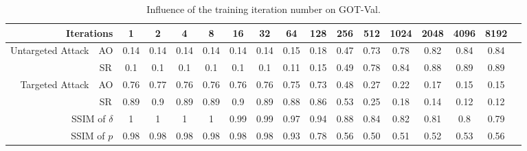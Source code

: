 \documentclass[journal]{IEEEtran}
\begin{document}
\begin{table}
  \centering
  \caption{Influence of the training iteration number on GOT-Val.}
  \begin{tabular}{rcccccccccccccccc} 
  \toprule
  \multicolumn{2}{r}{Iterations}     & 1     & 2     & 4     & 8     & 16    & 32    & 64    & 128   & 256   & 512   & 1024  & 2048  & 4096  & 8192  \\ 
  \midrule
  \multirow{2}{*}{Untargeted Attack} & AO    &  0.14 & 0.14 & 0.14 & 0.14 & 0.14 & 0.14 & 0.15 & 0.18 & 0.47 & 0.73 & 0.78 & 0.82 & 0.84 & 0.84  \\
                              & SR    &  0.1 & 0.1 & 0.1 & 0.1 & 0.1 & 0.1 & 0.11 & 0.15 & 0.49 & 0.78 & 0.84 & 0.88 & 0.89 & 0.89    \\ 
  \midrule
  \multirow{2}{*}{Targeted Attack} & AO   & 0.76 & 0.77 & 0.76 & 0.76 & 0.76 & 0.76 & 0.75 & 0.73 & 0.48 & 0.27 & 0.22 & 0.17 & 0.15 & 0.15    \\
                              & SR   & 0.89 & 0.9 & 0.89 & 0.89 & 0.9 & 0.89 & 0.88 & 0.86 & 0.53 & 0.25 & 0.18 & 0.14 & 0.12 & 0.12    \\ 
  \midrule
  \multicolumn{2}{r}{SSIM of $\delta$}&   1 & 1 & 1 & 1 & 0.99 & 0.99 & 0.97 & 0.94 & 0.88 & 0.84 & 0.82 & 0.81 & 0.8 & 0.79\\
  \midrule
  \multicolumn{2}{r}{SSIM of $p$}      &  0.98 & 0.98 & 0.98 & 0.98 & 0.98 & 0.98 & 0.93 & 0.78 & 0.56 & 0.50 & 0.51 & 0.52 & 0.53 & 0.56\\
  \bottomrule
  \end{tabular}
  \label{tab:iter}
\end{table}
\end{document}
